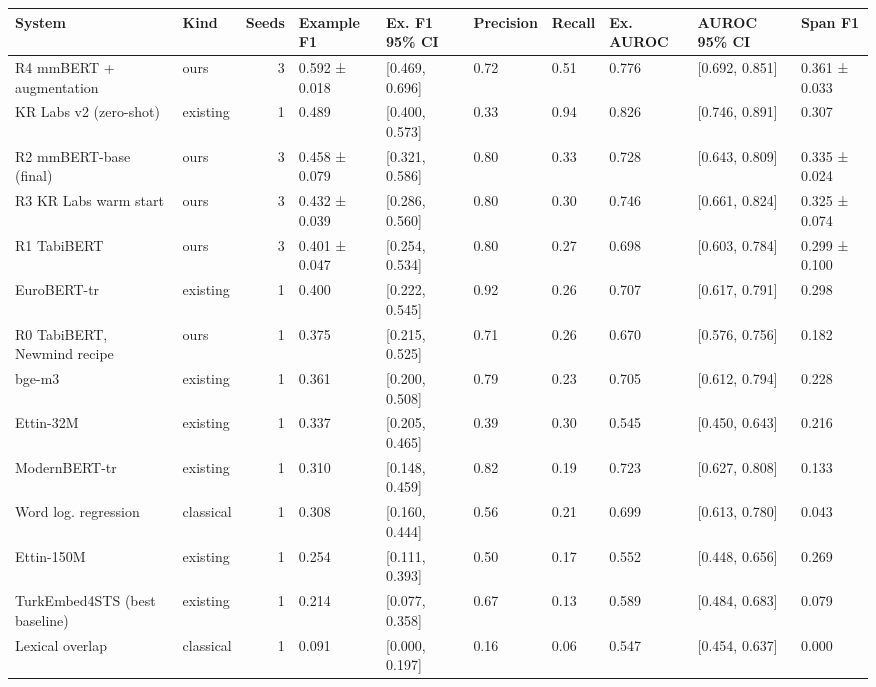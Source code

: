 \begin{tabular}{llrlllllll}
\toprule
System & Kind & Seeds & Example F1 & Ex. F1 95\% CI & Precision & Recall & Ex. AUROC & AUROC 95\% CI & Span F1 \\
\midrule
R4 mmBERT + augmentation & ours & 3 & 0.592 ± 0.018 & [0.469, 0.696] & 0.72 & 0.51 & 0.776 & [0.692, 0.851] & 0.361 ± 0.033 \\
KR Labs v2 (zero-shot) & existing & 1 & 0.489 & [0.400, 0.573] & 0.33 & 0.94 & 0.826 & [0.746, 0.891] & 0.307 \\
R2 mmBERT-base (final) & ours & 3 & 0.458 ± 0.079 & [0.321, 0.586] & 0.80 & 0.33 & 0.728 & [0.643, 0.809] & 0.335 ± 0.024 \\
R3 KR Labs warm start & ours & 3 & 0.432 ± 0.039 & [0.286, 0.560] & 0.80 & 0.30 & 0.746 & [0.661, 0.824] & 0.325 ± 0.074 \\
R1 TabiBERT & ours & 3 & 0.401 ± 0.047 & [0.254, 0.534] & 0.80 & 0.27 & 0.698 & [0.603, 0.784] & 0.299 ± 0.100 \\
EuroBERT-tr & existing & 1 & 0.400 & [0.222, 0.545] & 0.92 & 0.26 & 0.707 & [0.617, 0.791] & 0.298 \\
R0 TabiBERT, Newmind recipe & ours & 1 & 0.375 & [0.215, 0.525] & 0.71 & 0.26 & 0.670 & [0.576, 0.756] & 0.182 \\
bge-m3 & existing & 1 & 0.361 & [0.200, 0.508] & 0.79 & 0.23 & 0.705 & [0.612, 0.794] & 0.228 \\
Ettin-32M & existing & 1 & 0.337 & [0.205, 0.465] & 0.39 & 0.30 & 0.545 & [0.450, 0.643] & 0.216 \\
ModernBERT-tr & existing & 1 & 0.310 & [0.148, 0.459] & 0.82 & 0.19 & 0.723 & [0.627, 0.808] & 0.133 \\
Word log. regression & classical & 1 & 0.308 & [0.160, 0.444] & 0.56 & 0.21 & 0.699 & [0.613, 0.780] & 0.043 \\
Ettin-150M & existing & 1 & 0.254 & [0.111, 0.393] & 0.50 & 0.17 & 0.552 & [0.448, 0.656] & 0.269 \\
TurkEmbed4STS (best baseline) & existing & 1 & 0.214 & [0.077, 0.358] & 0.67 & 0.13 & 0.589 & [0.484, 0.683] & 0.079 \\
Lexical overlap & classical & 1 & 0.091 & [0.000, 0.197] & 0.16 & 0.06 & 0.547 & [0.454, 0.637] & 0.000 \\
\bottomrule
\end{tabular}
